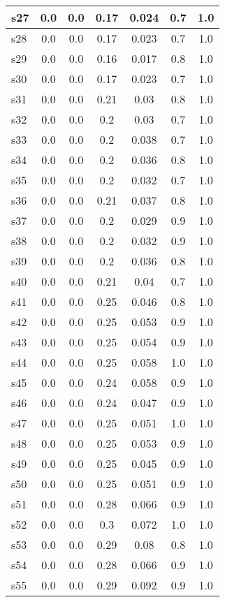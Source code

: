 \documentclass{article}
\begin{document}
\begin{tabular}{|l|c|c|c|c|c|c|}
\hline
s27 &0.0 & 0.0 & 0.17 & 0.024 & 0.7 & 1.0\\
\hline
s28 &0.0 & 0.0 & 0.17 & 0.023 & 0.7 & 1.0\\
\hline
s29 &0.0 & 0.0 & 0.16 & 0.017 & 0.8 & 1.0\\
\hline
s30 &0.0 & 0.0 & 0.17 & 0.023 & 0.7 & 1.0\\
\hline
s31 &0.0 & 0.0 & 0.21 & 0.03 & 0.8 & 1.0\\
\hline
s32 &0.0 & 0.0 & 0.2 & 0.03 & 0.7 & 1.0\\
\hline
s33 &0.0 & 0.0 & 0.2 & 0.038 & 0.7 & 1.0\\
\hline
s34 &0.0 & 0.0 & 0.2 & 0.036 & 0.8 & 1.0\\
\hline
s35 &0.0 & 0.0 & 0.2 & 0.032 & 0.7 & 1.0\\
\hline
s36 &0.0 & 0.0 & 0.21 & 0.037 & 0.8 & 1.0\\
\hline
s37 &0.0 & 0.0 & 0.2 & 0.029 & 0.9 & 1.0\\
\hline
s38 &0.0 & 0.0 & 0.2 & 0.032 & 0.9 & 1.0\\
\hline
s39 &0.0 & 0.0 & 0.2 & 0.036 & 0.8 & 1.0\\
\hline
s40 &0.0 & 0.0 & 0.21 & 0.04 & 0.7 & 1.0\\
\hline
s41 &0.0 & 0.0 & 0.25 & 0.046 & 0.8 & 1.0\\
\hline
s42 &0.0 & 0.0 & 0.25 & 0.053 & 0.9 & 1.0\\
\hline
s43 &0.0 & 0.0 & 0.25 & 0.054 & 0.9 & 1.0\\
\hline
s44 &0.0 & 0.0 & 0.25 & 0.058 & 1.0 & 1.0\\
\hline
s45 &0.0 & 0.0 & 0.24 & 0.058 & 0.9 & 1.0\\
\hline
s46 &0.0 & 0.0 & 0.24 & 0.047 & 0.9 & 1.0\\
\hline
s47 &0.0 & 0.0 & 0.25 & 0.051 & 1.0 & 1.0\\
\hline
s48 &0.0 & 0.0 & 0.25 & 0.053 & 0.9 & 1.0\\
\hline
s49 &0.0 & 0.0 & 0.25 & 0.045 & 0.9 & 1.0\\
\hline
s50 &0.0 & 0.0 & 0.25 & 0.051 & 0.9 & 1.0\\
\hline
s51 &0.0 & 0.0 & 0.28 & 0.066 & 0.9 & 1.0\\
\hline
s52 &0.0 & 0.0 & 0.3 & 0.072 & 1.0 & 1.0\\
\hline
s53 &0.0 & 0.0 & 0.29 & 0.08 & 0.8 & 1.0\\
\hline
s54 &0.0 & 0.0 & 0.28 & 0.066 & 0.9 & 1.0\\
\hline
s55 &0.0 & 0.0 & 0.29 & 0.092 & 0.9 & 1.0\\

\end{tabular}
\end{document}
